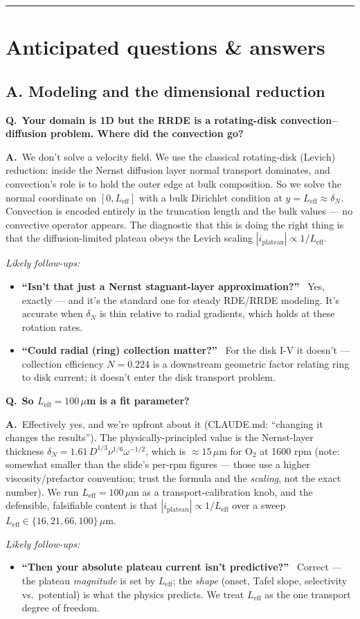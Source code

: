 \documentclass[11pt]{article}
\newcommand{\Leff}{L_{\mathrm{eff}}}
\newcommand{\Q}[1]{\medskip\par\noindent\textcolor{qcol}{\textbf{Q.}}\ \textbf{#1}\par\nopagebreak\smallskip}
\newcommand{\A}{\noindent\textbf{A.}\ \ignorespaces}
\newenvironment{followups}{\par\smallskip\noindent\emph{Likely follow-ups:}\begin{itemize}[leftmargin=1.6em,topsep=1pt]}{\end{itemize}}
\newcommand{\fu}[1]{\item \textbf{``#1''}\ }
\begin{document}
\medskip\hrule
\section{Anticipated questions \& answers}\label{sec:qa}

\subsection*{A. Modeling and the dimensional reduction}

\Q{Your domain is 1D but the RRDE is a rotating-disk convection--diffusion
problem. Where did the convection go?}
\A We don't solve a velocity field. We use the classical rotating-disk
(Levich) reduction: inside the Nernst diffusion layer normal transport
dominates, and convection's role is to hold the outer edge at bulk
composition. So we solve the normal coordinate on $[0,\Leff]$ with a bulk
Dirichlet condition at $y=\Leff\approx\delta_N$. Convection is encoded
entirely in the truncation length and the bulk values --- no convective
operator appears. The diagnostic that this is doing the right thing is that
the diffusion-limited plateau obeys the Levich scaling
$|i_{\mathrm{plateau}}|\propto1/\Leff$.
\begin{followups}
\fu{Isn't that just a Nernst stagnant-layer approximation?} Yes, exactly ---
and it's the standard one for steady RDE/RRDE modeling. It's accurate when
$\delta_N$ is thin relative to radial gradients, which holds at these
rotation rates.
\fu{Could radial (ring) collection matter?} For the disk I-V it doesn't ---
collection efficiency $N=0.224$ is a downstream geometric factor relating
ring to disk current; it doesn't enter the disk transport problem.
\end{followups}

\Q{So $\Leff=100\,\mu$m is a fit parameter?}
\A Effectively yes, and we're upfront about it (CLAUDE.md: ``changing it
changes the results''). The physically-principled value is the Nernst-layer
thickness $\delta_N=1.61\,D^{1/3}\nu^{1/6}\omega^{-1/2}$, which is
$\approx15\,\mu$m for O$_2$ at 1600 rpm (note: somewhat smaller than the
slide's per-rpm figures --- those use a higher viscosity/prefactor
convention; trust the formula and the \emph{scaling}, not the exact number).
We run $\Leff=100\,\mu$m as a transport-calibration knob, and the
defensible, falsifiable content is that $|i_{\mathrm{plateau}}|\propto
1/\Leff$ over a sweep $\Leff\in\{16,21,66,100\}\,\mu$m.
\begin{followups}
\fu{Then your absolute plateau current isn't predictive?} Correct --- the
plateau \emph{magnitude} is set by $\Leff$; the \emph{shape} (onset, Tafel
slope, selectivity vs.\ potential) is what the physics predicts. We treat
$\Leff$ as the one transport degree of freedom.
\end{followups}
\end{document}
